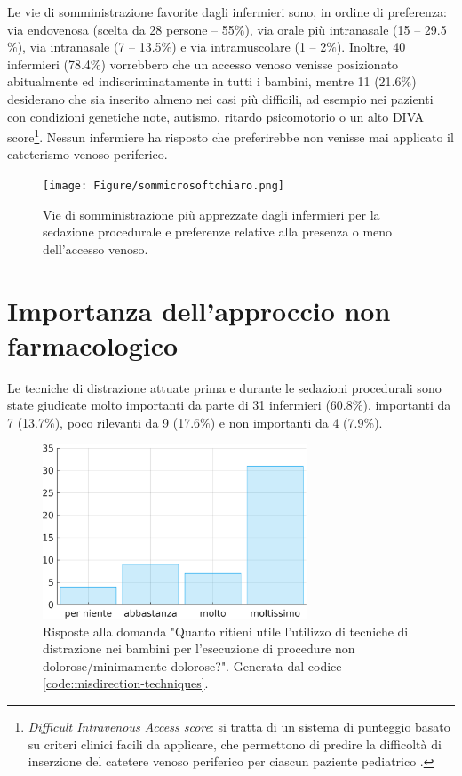 Le vie di somministrazione favorite dagli infermieri sono, in ordine di preferenza: via endovenosa (scelta da 28 persone -- 55$\%$), via orale più intranasale (15 -- 29.5$\%$), via intranasale (7 -- 13.5$\%$) e via intramuscolare (1 -- 2$\%$). Inoltre, 40 infermieri (78.4$\%$) vorrebbero che un accesso venoso venisse posizionato abitualmente ed indiscriminatamente in tutti i bambini, mentre 11 (21.6$\%$) desiderano che sia inserito almeno nei casi più difficili, ad esempio nei pazienti con condizioni genetiche note, autismo, ritardo psicomotorio o un alto DIVA score\footnote{\emph{Difficult Intravenous Access score}: si tratta di un sistema di punteggio basato su criteri clinici facili da applicare, che permettono di predire la difficoltà di inserzione del catetere venoso periferico per ciascun paziente pediatrico \cite{Yen2008}.}. Nessun infermiere ha risposto che preferirebbe non venisse mai applicato il cateterismo venoso periferico. 

\begin{figure}[!h]
    \centering
    \texttt{[image: Figure/sommicrosoftchiaro.png]}
    \caption{Vie di somministrazione più apprezzate dagli infermieri per la sedazione procedurale e preferenze relative alla presenza o meno dell'accesso venoso.}
    \label{fig:viedisomm}
\end{figure}

\newpage

\section{Importanza dell'approccio non farmacologico}

Le tecniche di distrazione attuate prima e durante le sedazioni procedurali sono state giudicate molto importanti da parte di 31 infermieri (60.8$\%$), importanti da 7 (13.7$\%$), poco rilevanti da 9 (17.6$\%$) e non importanti da 4 (7.9$\%$).

\bigskip

\begin{figure}[!h]
    \centering
    \includegraphics[width=0.7\textwidth]{Figure/distrazione.png}
    \caption{Risposte alla domanda "Quanto ritieni utile l’utilizzo di tecniche di distrazione nei bambini per l’esecuzione di procedure non dolorose/minimamente dolorose?". Generata dal codice \ref{code:misdirection-techniques}.}
    \label{fig:distrazione}
\end{figure}

